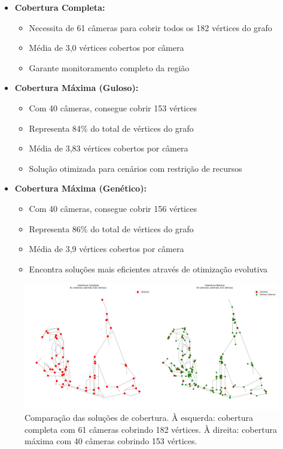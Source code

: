 \documentclass[12pt, a4paper]{report}
\begin{document}
\begin{itemize}
    \item \textbf{Cobertura Completa:}
    \begin{itemize}
        \item Necessita de 61 câmeras para cobrir todos os 182 vértices do grafo
        \item Média de 3,0 vértices cobertos por câmera
        \item Garante monitoramento completo da região
    \end{itemize}
    
    \item \textbf{Cobertura Máxima (Guloso):}
    \begin{itemize}
        \item Com 40 câmeras, consegue cobrir 153 vértices
        \item Representa 84\% do total de vértices do grafo
        \item Média de 3,83 vértices cobertos por câmera
        \item Solução otimizada para cenários com restrição de recursos
    \end{itemize}
    
    \item \textbf{Cobertura Máxima (Genético):}
    \begin{itemize}
        \item Com 40 câmeras, consegue cobrir 156 vértices
        \item Representa 86\% do total de vértices do grafo
        \item Média de 3,9 vértices cobertos por câmera
        \item Encontra soluções mais eficientes através de otimização evolutiva
    \end{itemize}
\end{itemize}

\begin{figure}[H]
    \centering
    \includegraphics[width=\textwidth]{resultados/visualizacao_cobertura}
    \caption{Comparação das soluções de cobertura. À esquerda: cobertura completa com 61 câmeras cobrindo 182 vértices. À direita: cobertura máxima com 40 câmeras cobrindo 153 vértices.}
    \label{fig:visualizacao_cobertura}
\end{figure}
\end{document}
